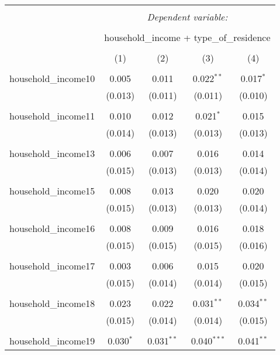 
\begin{table}[!htbp] \centering 
  \caption{} 
  \label{} 
\begin{tabular}{@{\extracolsep{5pt}}lcccc} 
\\[-1.8ex]\hline 
\hline \\[-1.8ex] 
 & \multicolumn{4}{c}{\textit{Dependent variable:}} \\ 
\cline{2-5} 
\\[-1.8ex] & \multicolumn{4}{c}{household\_income + type\_of\_residence} \\ 
\\[-1.8ex] & (1) & (2) & (3) & (4)\\ 
\hline \\[-1.8ex] 
 household\_income10 & 0.005 & 0.011 & 0.022$^{**}$ & 0.017$^{*}$ \\ 
  & (0.013) & (0.011) & (0.011) & (0.010) \\ 
  & & & & \\ 
 household\_income11 & 0.010 & 0.012 & 0.021$^{*}$ & 0.015 \\ 
  & (0.014) & (0.013) & (0.013) & (0.013) \\ 
  & & & & \\ 
 household\_income13 & 0.006 & 0.007 & 0.016 & 0.014 \\ 
  & (0.015) & (0.013) & (0.013) & (0.014) \\ 
  & & & & \\ 
 household\_income15 & 0.008 & 0.013 & 0.020 & 0.020 \\ 
  & (0.015) & (0.013) & (0.013) & (0.014) \\ 
  & & & & \\ 
 household\_income16 & 0.008 & 0.009 & 0.016 & 0.018 \\ 
  & (0.015) & (0.015) & (0.015) & (0.016) \\ 
  & & & & \\ 
 household\_income17 & 0.003 & 0.006 & 0.015 & 0.020 \\ 
  & (0.015) & (0.014) & (0.014) & (0.015) \\ 
  & & & & \\ 
 household\_income18 & 0.023 & 0.022 & 0.031$^{**}$ & 0.034$^{**}$ \\ 
  & (0.015) & (0.014) & (0.014) & (0.015) \\ 
  & & & & \\ 
 household\_income19 & 0.030$^{*}$ & 0.031$^{**}$ & 0.040$^{***}$ & 0.041$^{**}$ \\ 

\end{tabular}
\end{table}
